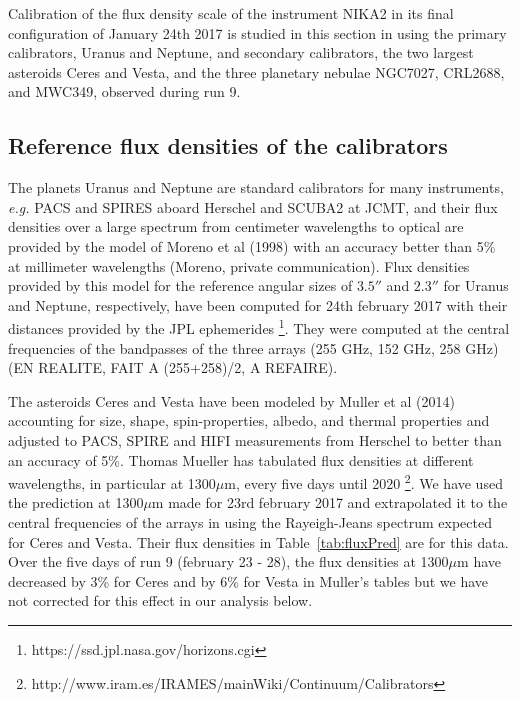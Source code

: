%


Calibration of the flux density scale of the instrument NIKA2 in its final configuration
of January 24th 2017  is studied in this section  in using the 
 primary calibrators, Uranus and Neptune, and secondary calibrators, the two largest asteroids Ceres and Vesta, and the three
planetary nebulae NGC7027, CRL2688, and MWC349, observed during run 9.

\subsection{Reference flux densities of the calibrators}

The planets Uranus and Neptune are standard calibrators for many instruments,
{\it e.g.} PACS and SPIRES aboard Herschel and SCUBA2 at JCMT,
and their flux densities over a large spectrum from centimeter wavelengths to optical are provided by the model of Moreno et al (1998)
with an accuracy better than
5\% at millimeter wavelengths (Moreno, private communication). Flux densities provided by this model for
the reference angular sizes of $3.5''$
and $2.3''$ for Uranus and Neptune, respectively, have been  computed
for 24th february 2017 with their
distances provided by  the JPL ephemerides \footnote{https://ssd.jpl.nasa.gov/horizons.cgi}.
They were computed at the central frequencies of the bandpasses of
the three arrays (255 GHz, 152 GHz, 258 GHz) (EN REALITE, FAIT A (255+258)/2, A REFAIRE).

The asteroids Ceres and Vesta have been modeled by Muller et al (2014) accounting for 
size, shape, spin-properties, albedo, and thermal properties and adjusted to PACS, SPIRE and HIFI measurements
from Herschel to better than an accuracy of 5\%. 
Thomas Mueller has tabulated flux densities at different wavelengths, in particular at 1300$\mu$m, every five days
until 2020 \footnote{http://www.iram.es/IRAMES/mainWiki/Continuum/Calibrators}.
We have used the prediction at  1300$\mu$m made for  23rd february 2017
and extrapolated it  to the central frequencies of the arrays in using the Rayeigh-Jeans
spectrum expected for Ceres and Vesta. Their flux densities in
Table~\ref{tab:fluxPred} are for this data. Over the five days of  run 9 (february 23 - 28), the
flux densities  at 1300$\mu$m  have decreased by  3\% 
for Ceres and  by 6\%  for Vesta in Muller's tables but we have not corrected for this effect in our analysis below.  


